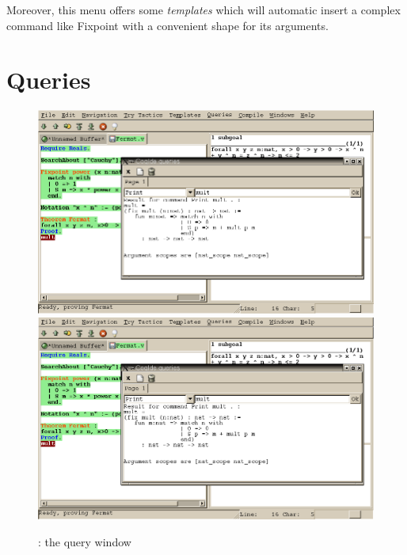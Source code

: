 Moreover, this menu offers some \emph{templates} which will automatic
insert a complex command like Fixpoint with a convenient shape for its
arguments. 

\section{Queries}

\begin{figure}[t]
\begin{center}
\ifpdf  %
\includegraphics[width=1.0\textwidth]{coqide-queries.png}
\else
\includegraphics[width=1.0\textwidth]{coqide-queries.eps}
\fi
\end{center}
\caption{\CoqIDE{}: the query window}
\label{fig:querywindow}
\end{figure}


